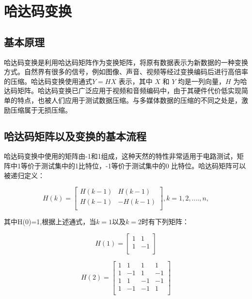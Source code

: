 \section{哈达码变换}

\subsection{基本原理}

哈达码变换是利用哈达码矩阵作为变换矩阵，将原有数据表示为新数据的一种变换方式。自然界有很多的信号，例如图像、声音、视频等经过变换编码后进行高倍率的压缩。哈达码变换使用通式$Y=HX$ 表示，其中 $X$ 和 $Y$ 均是一列向量，$H$ 为哈达码矩阵。哈达码变换已广泛应用于视频和音频编码中，由于其硬件代价低实现简单的特点，也被人们应用于测试数据压缩。与多媒体数据的压缩的不同之处是，激励压缩属于无损压缩。

\subsection{哈达码矩阵以及变换的基本流程}

哈达码变换中使用的矩阵由-1和1组成，这种天然的特性非常适用于电路测试，矩阵中1等价于测试集中的1比特位，-1等价于测试集中的0 比特位。哈达码矩阵可以被递归定义：

\begin{equation}
H(k)
=
\left[
\begin{array}{cc}
    H(k-1)&H(k-1)\\
    H(k-1)&-H(k-1)\\
\end{array}
\right]
,k=1,2,....,n,
\end{equation}

其中H(0)=1,根据上述通式，当$k=1$以及$k=2$时有下列矩阵：

\begin{equation}
H(1)
=
\left[
\begin{array}{cc}
    1&1\\
    1&-1\\
\end{array}
\right]
\end{equation}

\begin{equation}
H(2)
=
\left[
\begin{array}{cccc}
    1&1&1&1\\
    1&-1&1&-1\\
    1&1&-1&-1\\
    1&-1&-1&1\\
\end{array}
\right]
\end{equation}

